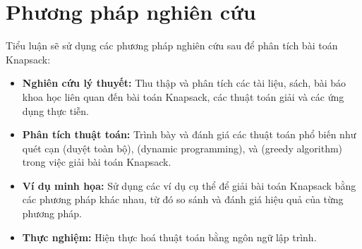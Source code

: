 \section{Phương pháp nghiên cứu}
Tiểu luận sẽ sử dụng các phương pháp nghiên cứu sau để phân tích bài toán Knapsack:
\begin{itemize}
    \item \textbf{Nghiên cứu lý thuyết:} Thu thập và phân tích các tài liệu, sách, bài báo khoa học liên quan đến bài toán Knapsack, các thuật toán giải và các ứng dụng thực tiễn.
    \item \textbf{Phân tích thuật toán:} Trình bày và đánh giá các thuật toán phổ biến như quét cạn (duyệt toàn bộ),  (dynamic programming), và  (greedy algorithm) trong việc giải bài toán Knapsack.
    \item \textbf{Ví dụ minh họa:} Sử dụng các ví dụ cụ thể để giải bài toán Knapsack bằng các phương pháp khác nhau, từ đó so sánh và đánh giá hiệu quả của từng phương pháp.
    \item \textbf{Thực nghiệm:} Hiện thực hoá thuật toán bằng ngôn ngữ lập trình.
\end{itemize}




